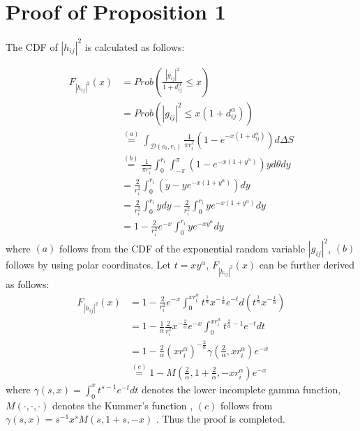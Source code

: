 \documentclass[journal]{IEEEtran}
\begin{document}
\section{Proof of Proposition 1}
The CDF of $\left|h_{ij} \right|^2$ is calculated as follows:

\begin{align}
F_{\left|h_{ij} \right|^2} \left(x\right) &= Prob\left(\frac{\left|g_{ij}\right|^2}{1 + d_{ij}^{\alpha}} \leq x \right) \nonumber \\
& = Prob \left(\left|g_{ij}\right|^2 \leq x \left(1 + d_{ij}^\alpha\right)\right) \nonumber \\
& \overset{\left(a\right)}{=} \int_{\mathcal{D}(o_i, r_i)} \frac{1}{\pi r_i^2}\left(1 - e^{-x\left(1 + d_{ij}^{\alpha}\right)}\right) d\Delta S \nonumber\\
& \overset{\left(b\right)}{=} \frac{1}{\pi r_i^2} \int_{0}^{r_i} \int_{-\pi}^{\pi}\left(1 - e^{-x\left(1 + y^{\alpha}\right)}\right)y d \theta d y \nonumber \\
& = \frac{2}{r_i^2}\int_{0}^{r_i} \left(y - ye^{-x\left(1 + y^\alpha\right)}\right) dy \nonumber \\
& = \frac{2}{r_i^2}\int_{0}^{r_i}y dy - \frac{2}{r_i^2}\int_{0}^{r_i} y e^{-x \left(1 + y^\alpha\right)}dy \nonumber \\
& = 1 - \frac{2}{r_i^2}e^{-x} \int_{0}^{r_i}y e^{-xy^{\alpha}}dy
\end{align}
where $\left(a\right)$ follows from the CDF of the exponential random variable $\left|g_{ij}\right|^2$, $\left(b\right)$ follows by using polar coordinates. Let $t = xy^{\alpha}$, $F_{\left|h_{ij} \right|^2} \left(x\right)$ can be further derived as follows:
\begin{align}
F_{\left|h_{ij} \right|^2} \left(x\right) &= 1 - \frac{2}{r_i^2}e^{-x} \int_{0}^{x r_i^{\alpha}} t^{\frac{1}{\alpha}} x^{-\frac{1}{\alpha}}e^{-t} d\left(t^{\frac{1}{\alpha}} x^{-\frac{1}{\alpha}}\right) \nonumber \\
& = 1 - \frac{1}{\alpha} \frac{2}{r_i^2} x^{-\frac{2}{\alpha}} e^{-x} \int_{0}^{x r_i^{\alpha}} t^{\frac{2}{\alpha} - 1}e^{-t} dt \nonumber \\
& = 1 - \frac{2}{\alpha} \left(x r_i^{\alpha}\right) ^{-\frac{2}{\alpha}} \gamma\left(\frac{2}{\alpha}, xr_i^{\alpha}\right)e^{-x} \nonumber \\
& \overset{\left(c\right)}{=} 1 - M\left(\frac{2}{\alpha}, 1 + \frac{2}{\alpha}, -xr_i^{\alpha}\right)e^{-x}
\end{align}
where $\gamma\left(s,x\right) = \int_{0}^{x}t^{s-1}e^{-t}dt$ denotes the lower incomplete gamma function, $M\left(\cdot,\cdot,\cdot\right)$ denotes the Kummer's function \cite{MAbramowitz}, $\left(c\right)$ follows from $\gamma\left(s,x\right) = s^{-1} x^s M\left(s,1+s,-x\right)$ \cite[6.5.12]{MAbramowitz}. Thus the proof is completed. 
\end{document}
